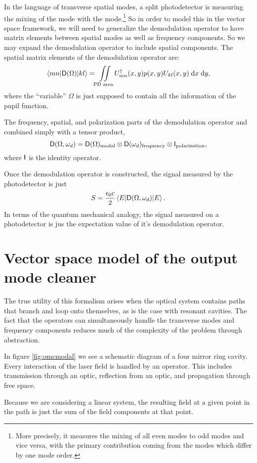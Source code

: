 In the language of transverse spatial modes, a split photodetector is measuring the mixing of the  mode with the  mode.\footnote{More precisely, it measures the mixing of all even modes to odd modes and vice versa, with the primary contribution coming from the modes which differ by one mode order.}  So in order to model this in the vector space framework, we will need to generalize the demodulation operator to have matrix elements between spatial modes as well as frequency components. %
So we may expand the demodulation operator to include spatial components. %
The spatial matrix elements of the demodulation operator are:
\begin{equation}
\matrixel{mn}{\oper{D}(\Omega)}{kl}=\iint\limits_{\text{PD area}}U_{mn}^\dagger(x,y)p(x,y)U_{kl}(x,y)\dd x \dd y,
\end{equation}
where the ``variable'' %
$\Omega$ is just supposed to contain all the information of the pupil function.

The frequency, spatial, and polarization parts of the demodulation operator and combined simply with a tensor product,
\begin{equation}
\mathsf{D}(\Omega,\omega_d) = \mathsf{D}(\Omega)_{\text{modal}}\otimes\mathsf{D}(\omega_d)_{\text{frequency}}\otimes\mathsf{I}_{\text{polarization}},
\end{equation}
where $\mathsf{I}$ is the identity operator.

Once the demodulation operator is constructed, the signal measured by the photodetector is just
\begin{equation}
S=\frac{\epsilon_0 c}{2}\matrixel{E}{\oper{D}(\Omega,\omega_d)}{E}.
\end{equation}
In terms of the quantum mechanical analogy, the signal measured on a photodetector is jus the expectation value of it's demodulation operator.

\section{Vector space model of the output mode cleaner}
The true utility of this formalism arises when the optical system contains paths that branch and loop onto themselves, as is the case with resonant cavities. %
The fact that the operators can simultaneously handle the transverse modes and frequency components reduces much of the complexity of the problem through abstraction.

In figure \ref{fig:omcmodal}  we see a schematic diagram of a four mirror ring cavity. %
Every interaction of the laser field is handled by an operator. %
This includes transmission through an optic, reflection from an optic, and propagation through free space. %


Because we are considering a linear system, the resulting field at a given point in the path is just the sum of the field components at that point. %

